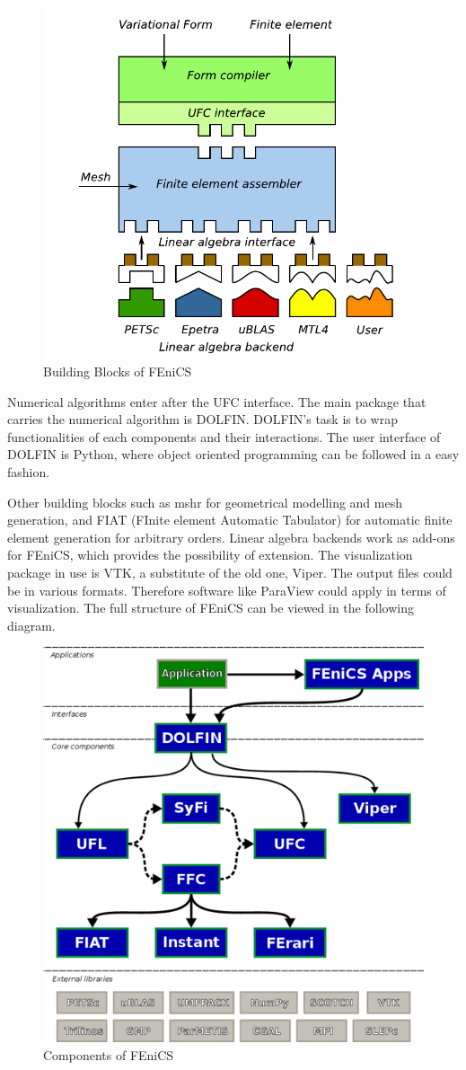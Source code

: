 \begin{figure}[h]
\center
\label{fig: fenics blocks}
\includegraphics[width=0.6\linewidth]{../pics/fenics_building_blocks.png}
\caption{Building Blocks of FEniCS \citep{wells2012automated}}
\end{figure} 

Numerical algorithms enter after the UFC interface. The main package that carries the numerical algorithm is DOLFIN. DOLFIN's task is to wrap functionalities of each components and their interactions. The user interface of DOLFIN is Python, where object oriented programming can be followed in a easy fashion.  

Other building blocks such as mshr for geometrical modelling and mesh generation, and FIAT (FInite element Automatic Tabulator) for automatic finite element generation for arbitrary orders. Linear algebra backends work as add-ons for FEniCS, which provides the possibility of extension. The visualization package in use is VTK, a substitute of the old one, Viper. The output files could be in various formats. Therefore software like ParaView could apply in terms of visualization. The full structure of FEniCS can be viewed in the following diagram.

\begin{figure}[h]
\center
\label{fig: fenics map}
\includegraphics[width=0.5\linewidth]{../pics/fenics_map.png}
\caption{Components of FEniCS \citep{wells2012automated}}
\end{figure} 


